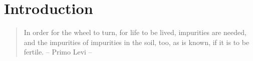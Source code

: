 \graphicspath{{figures/}}
\renewcommand\evenpagerightmark{{\scshape\small Introduction}}
\renewcommand\oddpageleftmark{{\scshape\small Chapter 1}}


\hyphenation{}

\chapter[Introduction]%
{Introduction}
\label{ch1}

\begin{flushright}
\begin{quotation}
In order for the wheel to turn, for life to be lived, impurities are needed, and the impurities of impurities in the soil, too, as is known, if it is to be fertile. -- Primo Levi --
\end{quotation}
\end{flushright}
\npar

